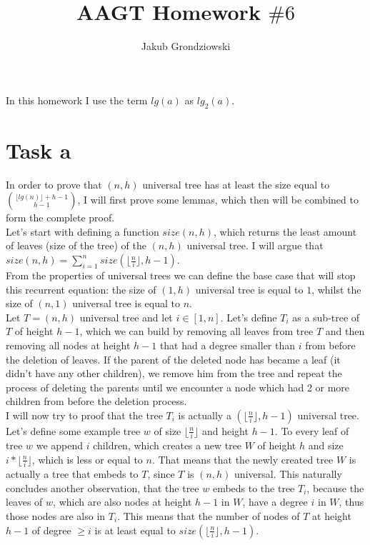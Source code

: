 \documentclass{article}
\title{AAGT Homework $\#6$}
\author{Jakub Grondziowski}
\date{}
\begin{document}
\maketitle

In this homework I use the term $lg(a)$ as $lg_{2}(a)$.

\section{Task a}

In order to prove that $(n, h)$ universal tree has at least the size equal to $\binom{\lfloor lg(n) \rfloor + h - 1}{h - 1}$, I will first prove some lemmas, which then will be combined to form the complete proof. \\

Let's start with defining a function $size(n, h)$, which returns the least amount of leaves (size of the tree) of the $(n, h)$ universal tree. I will argue that $size(n, h) = \sum_{i=1}^{n}size(\lfloor \frac{n}{i} \rfloor, h-1)$. \\

From the properties of universal trees we can define the base case that will stop this recurrent equation: the size of $(1,h)$ universal tree is equal to $1$, whilst the size of $(n, 1)$ universal tree is equal to $n$. \\

Let $T = (n, h)$ universal tree and let $i \in [1, n]$. Let's define $T_{i}$ as a sub-tree of $T$ of height $h-1$, which we can build by removing all leaves from tree $T$ and then removing all nodes at height $h-1$ that had a degree smaller than $i$ from before the deletion of leaves. If the parent of the deleted node has became a leaf (it didn't have any other children), we remove him from the tree and repeat the process of deleting the parents until we encounter a node which had 2 or more children from before the deletion process. \\

I will now try to proof that the tree $T_{i}$ is actually a $(\lfloor \frac{n}{i} \rfloor, h-1)$ universal tree. Let's define some example tree $w$ of size $\lfloor \frac{n}{i} \rfloor$ and height $h-1$. To every leaf of tree $w$ we append $i$ children, which creates a new tree $W$ of height $h$ and size $i * \lfloor \frac{n}{i} \rfloor$, which is less or equal to $n$. That means that the newly created tree $W$ is actually a tree that embeds to $T$, since $T$ is $(n, h)$ universal. This naturally concludes another observation, that the tree $w$ embeds to the tree $T_{i}$, because the leaves of $w$, which are also nodes at height $h-1$ in $W$, have a degree $i$ in $W$, thus those nodes are also in $T_{i}$. This means that the number of nodes of $T$ at height $h-1$ of degree $\geq i$ is at least equal to $size(\lfloor \frac{n}{i} \rfloor, h-1)$. \\
\end{document}
